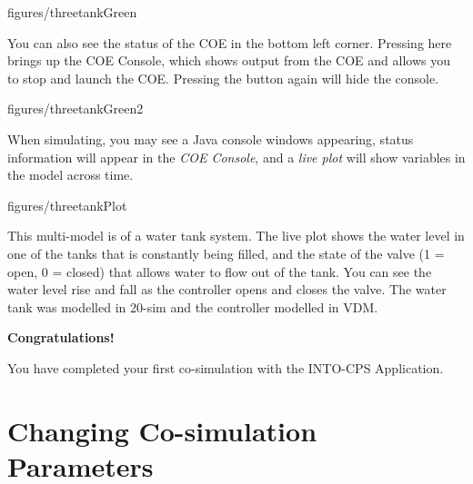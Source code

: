 \documentclass[11pt,a4paper]{../tutorial}
\begin{document}
\begin{instructions}
    \begin{annotation}[width=0.85\linewidth,trim=0 0 0 0,clip]{figures/threetankGreen}
    \end{annotation}

    You can also see the status of the COE in the bottom left corner. Pressing here brings up the COE Console, which shows output from the COE and allows you to stop and launch the COE. Pressing the button again will hide the console.

    \begin{annotation}[width=0.85\linewidth,trim=0 0 0 240,clip]{figures/threetankGreen2}
    \end{annotation}

\newpage
\item When simulating, you may see a Java console windows appearing, status information will appear in the \emph{COE Console}, and a \emph{live plot} will show variables in the model across time.

    \begin{annotation}[width=0.84\linewidth]{figures/threetankPlot}
    \end{annotation}

    This multi-model is of a water tank system. The live plot shows the water level in one of the tanks that is constantly being filled, and the state of the valve (1 = open, 0 = closed) that allows water to flow out of the tank. You can see the water level rise and fall as the controller opens and closes the valve. The water tank was modelled in 20-sim and the controller modelled in VDM.

    \bigskip
    \bigskip
    {\large\bfseries Congratulations!}

    You have completed your first co-simulation with the INTO-CPS Application.

\end{instructions}

\newpage
\section{Changing Co-simulation Parameters}
\end{document}
